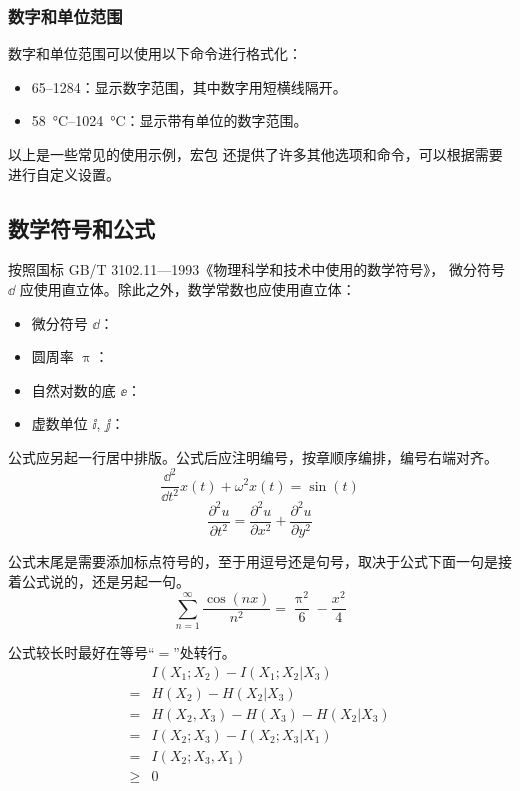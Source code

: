 \subsubsection*{数字和单位范围}

数字和单位范围可以使用以下命令进行格式化：

\begin{itemize}
  \item \numrange{65}{1284}：显示数字范围，其中数字用短横线隔开。
  \item \SIrange{58}{1024}{\degreeCelsius}：显示带有单位的数字范围。
\end{itemize}

以上是一些常见的使用示例，宏包  还提供了许多其他选项和命令，可以根据需要进行自定义设置。

\subsection{数学符号和公式}

按照国标 GB/T 3102.11—1993《物理科学和技术中使用的数学符号》，
微分符号 $\dd$ 应使用直立体。除此之外，数学常数也应使用直立体：
\begin{itemize}
  \item 微分符号 $\dd$：
  \item 圆周率 $\uppi$：
  \item 自然对数的底 $\ee$：
  \item 虚数单位 $\ii$, $\jj$： 
\end{itemize}

公式应另起一行居中排版。公式后应注明编号，按章顺序编排，编号右端对齐。
\begin{equation}
  \frac{\dd^2}{\dd t^2}x(t)+\omega^2x(t)=\sin(t)
\end{equation}
\begin{equation}
  \frac{\partial^2u}{\partial t^2}=\frac{\partial^2u}{\partial x^2}+\frac{\partial^2u}{\partial y^2}
\end{equation}

公式末尾是需要添加标点符号的，至于用逗号还是句号，取决于公式下面一句是接着公式说的，还是另起一句。
\begin{equation}
  \sum_{n=1}^{\infty}\frac{\cos(nx)}{n^2}=\frac{\uppi^2}{6}-\frac{x^2}{4}
\end{equation}

公式较长时最好在等号“$=$”处转行。
\begin{align}
       & I(X_1;X_2)-I(X_1;X_2|X_3) \nonumber    \\
  =    & H(X_2)-H(X_2|X_3) \nonumber            \\
  =    & H(X_2,X_3)-H(X_3)-H(X_2|X_3) \nonumber \\
  =    & I(X_2;X_3)-I(X_2;X_3|X_1) \nonumber    \\
  =    & I(X_2;X_3,X_1) \nonumber               \\
  \geq & 0
\end{align}


